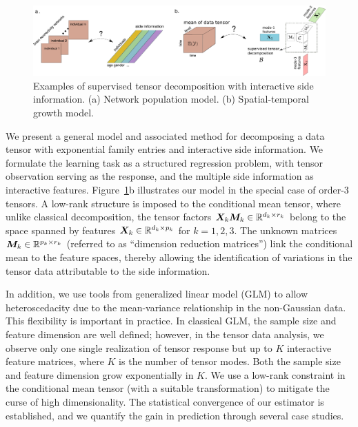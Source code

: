 \documentclass[12pt]{article}
\theoremstyle{plain}
\theoremstyle{definition}
\begin{document}
\begin{figure}[t]
\begin{center}
\includegraphics[width=16cm]{new_introfigure1.pdf}
\end{center}
\caption{Examples of supervised tensor decomposition with interactive side information. (a) Network population model. (b) Spatial-temporal growth model. }\label{fig:intro1}
\end{figure}

We present a general model and associated method for decomposing a data tensor with exponential family entries and interactive side information. 
We formulate the learning task as a structured regression problem, with tensor observation serving as the response, and the multiple side information as interactive features. Figure~\ref{fig:intro1}b illustrates our model in the special case of order-3 tensors. A low-rank structure is imposed to the conditional mean tensor, where unlike classical decomposition, the tensor factors $\bm X_k\bm M_k\in\mathbb{R}^{d_k\times r_k}$ belong to the space spanned by features $\bm X_k\in\mathbb{R}^{d_k\times p_k}$ for $k=1,2,3$. The unknown matrices $\bm M_k\in\mathbb{R}^{p_k\times r_k}$ (referred to as ``dimension reduction matrices'') link the conditional mean to the feature spaces, thereby allowing the identification of variations in the tensor data attributable to the side information.

In addition, we use tools from generalized linear model (GLM) to allow heteroscedacity due to the mean-variance relationship in the non-Gaussian data. This flexibility is important in practice. In classical GLM, the sample size and feature dimension are well defined; however, in the tensor data analysis, we observe only one single realization of tensor response but up to $K$ interactive feature matrices, where $K$ is the number of tensor modes. Both the sample size and feature dimension grow exponentially in $K$. We use a low-rank constraint in the conditional mean tensor (with a suitable transformation) to mitigate the curse of high dimensionality. The statistical convergence of our estimator is established, and we quantify the gain in prediction through several case studies. 
 
\end{document}
